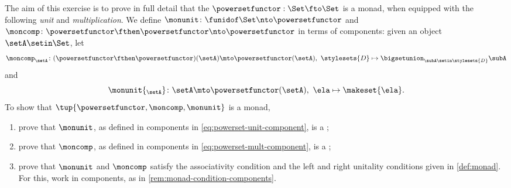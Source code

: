 \begin{gradedexercise}
    \label{ex:PowersetMonad}
    The aim of this exercise is to prove in full detail that the   $\powersetfunctor : \Set \fto \Set$ is a monad, when equipped with the following \emph{unit} and \emph{multiplication}.
    We define $\monunit \colon \funidof\Set \nto \powersetfunctor$ and $\moncomp \colon \powersetfunctor \fthen \powersetfunctor \nto \powersetfunctor$ in terms of components: given an object $\setA \setin \Set$, let
    \begin{equation}
        \label{eq:powerset-mult-component}
        \moncomp_{\setA} \colon (\powersetfunctor \fthen \powersetfunctor)(\setA) \mto \powersetfunctor(\setA), \ \stylesets{D} \mapsto \bigsetunion_{\subA \setin \stylesets{D}} \subA
    \end{equation}
    and
    \begin{equation}
        \label{eq:powerset-unit-component}
        \monunit{_\setA} \colon \setA \mto \powersetfunctor(\setA), \ \ela \mapsto \makeset{ \ela }.
    \end{equation}
    To show that $\tup{\powersetfunctor, \moncomp, \monunit}$ is a monad,
    \begin{enumerate}
        \item prove that $\monunit$, as defined in components in \cref{eq:powerset-unit-component}, is a ;
        \item prove that $\moncomp$, as defined in components in \cref{eq:powerset-mult-component}, is a ;
        \item prove that $\monunit$ and $\moncomp$ satisfy the associativity condition and the left and right unitality conditions given in \cref{def:monad}.
              For this, work in components, as in \cref{rem:monad-condition-components}.
    \end{enumerate}
\end{gradedexercise}

